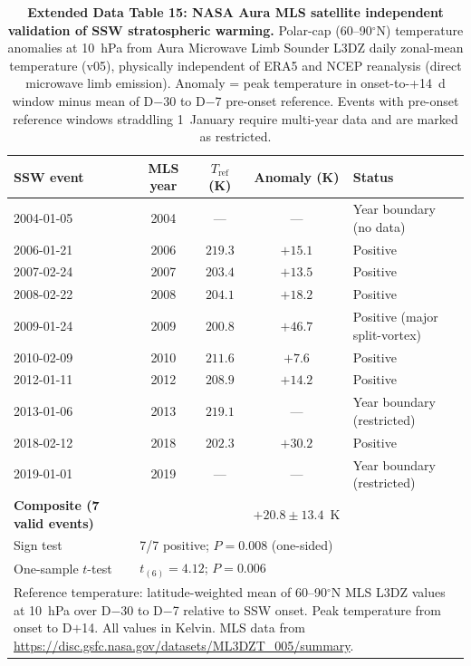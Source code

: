 \documentclass[11pt,letterpaper]{article}
\begin{document}
\begin{table}[!ht]
\centering
\caption{\textbf{Extended Data Table 15: NASA Aura MLS satellite independent validation of SSW stratospheric warming.}
Polar-cap (60--90$^\circ$N) temperature anomalies at 10~hPa from Aura Microwave Limb Sounder L3DZ daily zonal-mean temperature (v05), physically independent of ERA5 and NCEP reanalysis (direct microwave limb emission). Anomaly = peak temperature in onset-to-+14~d window minus mean of D$-$30 to D$-$7 pre-onset reference. Events with pre-onset reference windows straddling 1~January require multi-year data and are marked as restricted.}
\label{tab:mls_validation}
\small
\begin{tabular}{lcccl}
\toprule
SSW event & MLS year & $T_{\mathrm{ref}}$ (K) & Anomaly (K) & Status \\
\midrule
2004-01-05 & 2004 & --- & --- & Year boundary (no data) \\
2006-01-21 & 2006 & $219.3$ & $+15.1$ & Positive \\
2007-02-24 & 2007 & $203.4$ & $+13.5$ & Positive \\
2008-02-22 & 2008 & $204.1$ & $+18.2$ & Positive \\
2009-01-24 & 2009 & $200.8$ & $+46.7$ & Positive (major split-vortex) \\
2010-02-09 & 2010 & $211.6$ & $+7.6$ & Positive \\
2012-01-11 & 2012 & $208.9$ & $+14.2$ & Positive \\
2013-01-06 & 2013 & $219.1$ & --- & Year boundary (restricted) \\
2018-02-12 & 2018 & $202.3$ & $+30.2$ & Positive \\
2019-01-01 & 2019 & --- & --- & Year boundary (restricted) \\
\midrule
\textbf{Composite (7 valid events)} & & & $\mathbf{+20.8 \pm 13.4}$~K & \\
Sign test & \multicolumn{3}{l}{7/7 positive; $P = 0.008$ (one-sided)} & \\
One-sample $t$-test & \multicolumn{3}{l}{$t_{(6)} = 4.12$; $P = 0.006$} & \\
\bottomrule
\multicolumn{5}{p{14cm}}{\footnotesize Reference temperature: latitude-weighted mean of 60--90$^\circ$N MLS L3DZ values at 10~hPa over D$-$30 to D$-$7 relative to SSW onset. Peak temperature from onset to D$+$14. All values in Kelvin. MLS data from \url{https://disc.gsfc.nasa.gov/datasets/ML3DZT_005/summary}.}
\end{tabular}
\end{table}
\end{document}
